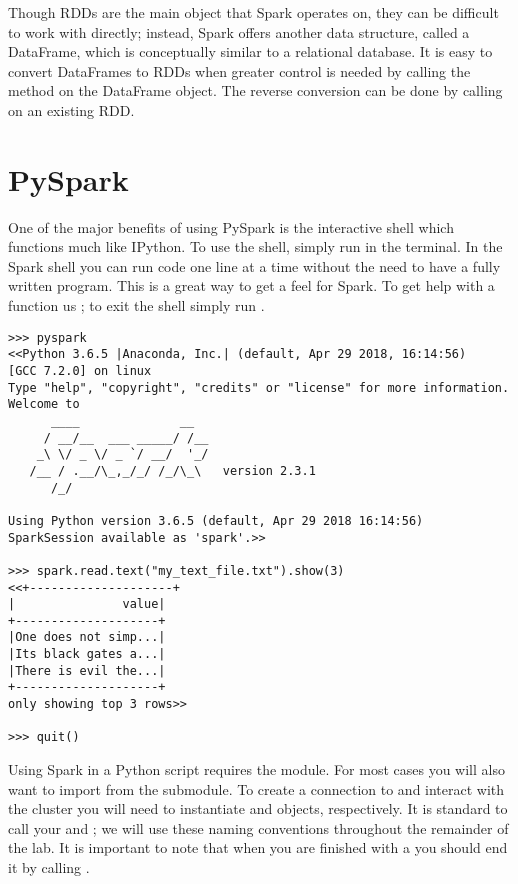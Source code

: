 Though RDDs are the main object that Spark operates on, they can be difficult to work with directly; instead, Spark offers another data structure, called a DataFrame, which is conceptually similar to a relational database. It is easy to convert DataFrames to RDDs when greater control is needed by calling the  method on the DataFrame object. The reverse conversion can be done by calling  on an existing RDD.

\section*{PySpark} %
One of the major benefits of using PySpark is the interactive shell which functions much like IPython. To use the shell, simply run  in the terminal. In the Spark shell you can run code one line at a time without the need to have a fully written program. This is a great way to get a feel for Spark. To get help with a function us ; to exit the shell simply run .

\begin{lstlisting}
>>> pyspark
<<Python 3.6.5 |Anaconda, Inc.| (default, Apr 29 2018, 16:14:56) 
[GCC 7.2.0] on linux
Type "help", "copyright", "credits" or "license" for more information.
Welcome to
      ____              __
     / __/__  ___ _____/ /__
    _\ \/ _ \/ _ `/ __/  '_/
   /__ / .__/\_,_/_/ /_/\_\   version 2.3.1
      /_/

Using Python version 3.6.5 (default, Apr 29 2018 16:14:56)
SparkSession available as 'spark'.>>

>>> spark.read.text("my_text_file.txt").show(3)
<<+--------------------+
|               value|
+--------------------+
|One does not simp...|
|Its black gates a...|
|There is evil the...|
+--------------------+
only showing top 3 rows>>

>>> quit()
\end{lstlisting}

Using Spark in a Python script requires the  module. For most cases you will also want to import  from the  submodule. To create a connection to and interact with the cluster you will need to instantiate  and  objects, respectively. It is standard to call your   and  ; we will use these naming conventions throughout the remainder of the lab. It is important to note that when you are finished with a  you should end it by calling .


